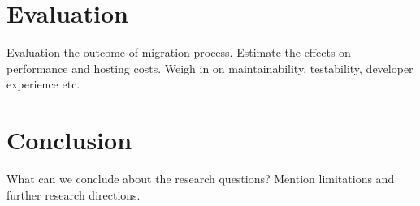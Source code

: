 \documentclass[utf8,english]{gradu3}
\begin{document}
\chapter{Evaluation}

Evaluation the outcome of migration process. Estimate the effects on performance and hosting costs. Weigh in on maintainability, testability, developer experience etc.

\chapter{Conclusion}

What can we conclude about the research questions? Mention limitations and further research directions.

\printbibliography
\end{document}
